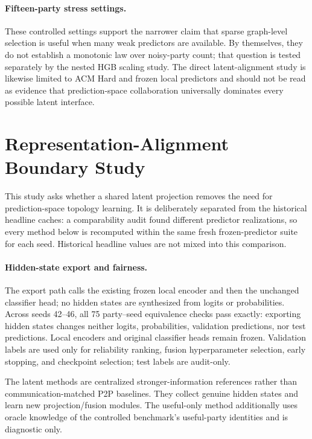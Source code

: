 \documentclass[letterpaper]{article}
\begin{document}
\paragraph{Fifteen-party stress settings.}
These controlled settings support the narrower claim that sparse graph-level
selection is useful when many weak predictors are available. By themselves,
they do not establish a monotonic law over noisy-party count; that question is
tested separately by the nested HGB scaling study. The direct latent-alignment
study is likewise limited to ACM Hard and frozen local predictors and should
not be read as evidence that prediction-space collaboration universally
dominates every possible latent interface.


\section{Representation-Alignment Boundary Study}
\label{sec:supp-alignment}

This study asks whether a shared latent projection removes the need for
prediction-space topology learning. It is deliberately separated from the
historical headline caches: a comparability audit found different predictor
realizations, so every method below is recomputed within the same fresh
frozen-predictor suite for each seed. Historical headline values are not mixed
into this comparison.

\paragraph{Hidden-state export and fairness.}
The export path calls the existing frozen local encoder and then the unchanged
classifier head; no hidden states are synthesized from logits or probabilities.
Across seeds 42--46, all 75 party--seed equivalence checks pass exactly:
exporting hidden states changes neither logits, probabilities, validation
predictions, nor test predictions. Local encoders and original classifier heads
remain frozen. Validation labels are used only for reliability ranking, fusion
hyperparameter selection, early stopping, and checkpoint selection; test labels
are audit-only.

The latent methods are centralized stronger-information references rather than
communication-matched P2P baselines. They collect genuine hidden states and
learn new projection/fusion modules. The useful-only method additionally uses
oracle knowledge of the controlled benchmark's useful-party identities and is
diagnostic only.
\end{document}
